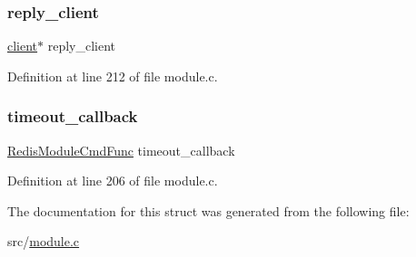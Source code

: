 \subsubsection{\texorpdfstring{reply\+\_\+client}{reply\_client}}
{\footnotesize\ttfamily \hyperlink{structclient}{client}$\ast$ reply\+\_\+client}



Definition at line 212 of file module.\+c.

\mbox{\label{struct_redis_module_blocked_client_ad5b2a934fdf4cacf6ea5126c4ae31bf6}} 
\subsubsection{\texorpdfstring{timeout\+\_\+callback}{timeout\_callback}}
{\footnotesize\ttfamily \hyperlink{redismodule_8h_afd84062b24c2151cf8f2a53b955f9eed}{Redis\+Module\+Cmd\+Func} timeout\+\_\+callback}



Definition at line 206 of file module.\+c.



The documentation for this struct was generated from the following file\+:\begin{DoxyCompactItemize}
\item 
src/\hyperlink{module_8c}{module.\+c}\end{DoxyCompactItemize}
